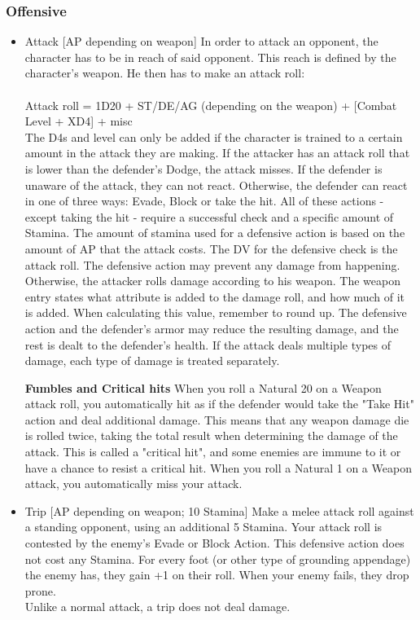 \subsubsection{Offensive}
\begin{itemize}
\item Attack [AP depending on weapon]
In order to attack an opponent, the character has to be in reach of said opponent.
This reach is defined by the character's weapon.
He then has to make an attack roll:\\
\\
Attack roll = 1D20 + ST/DE/AG (depending on the weapon) + [Combat Level + XD4] + misc
\\
The D4s and level can only be added if the character is trained to a certain amount in the attack they are making.
If the attacker has an attack roll that is lower than the defender's Dodge, the attack misses.
If the defender is unaware of the attack, they can not react.
Otherwise, the defender can react in one of three ways: Evade, Block or take the hit.
All of these actions - except taking the hit - require a successful check and a specific amount of Stamina.
The amount of stamina used for a defensive action is based on the amount of  AP that the attack costs.
The DV for the defensive check is the attack roll.
The defensive action may prevent any damage from happening.
Otherwise, the attacker rolls damage according to his weapon.
The weapon entry states what attribute is added to the damage roll, and how much of it is added.
When calculating this value, remember to round up.
The defensive action and the defender's armor may reduce the resulting damage, and the rest is dealt to the defender's health.
If the attack deals multiple types of damage, each type of damage is treated separately.


\textbf{Fumbles and Critical hits}
When you roll a Natural 20 on a Weapon attack roll, you automatically hit as if the defender would take the "Take Hit" action and deal additional damage.
This means that any weapon damage die is rolled twice, taking the total result when determining the damage of the attack.
This is called a "critical hit", and some enemies are immune to it or have a chance to resist a critical hit.
When you roll a Natural 1 on a Weapon attack, you automatically miss your attack.


\item Trip [AP depending on weapon; 10 Stamina]
Make a melee attack roll against a standing opponent, using an additional 5 Stamina.
Your attack roll is contested by the enemy's Evade or Block Action.
This defensive action does not cost any Stamina.
For every foot (or other type of grounding appendage) the enemy has, they gain +1 on their roll.
When your enemy fails, they drop prone.\\
Unlike a normal attack, a trip does not deal damage.\\



\end{itemize}
